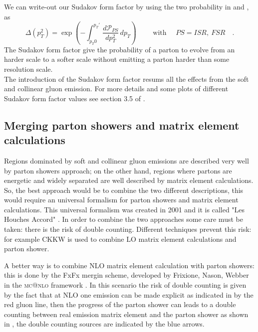 We can write-out our Sudakov form factor by using the two probability in  and , as
\begin{equation}
	\Delta(p_T^2)=\exp\left( -\displaystyle\int_{p_T0}^{p_T'} \frac{d\mathcal{P}_{PS}}{dp_T^2} \,dp_T\right) \qquad\text{ with } \quad PS=ISR,\ FSR \quad.
	\label{eq:sudakovFormFactor}
\end{equation}
The Sudakov form factor give the probability of a parton to evolve from an harder scale to a softer scale without emitting a parton harder than some resolution scale. 
\\
The introduction of the Sudakov form factor resums all the effects from the soft and collinear gluon emission. For more details and some plots of different Sudakov form factor values see section 3.5 of \cite{Campbell2006}.

\subsection{Merging parton showers and matrix element calculations}

Regions dominated by soft and collinear gluon emissions are described very well by parton showers approach; on the other hand, regions where partons are  energetic and widely separated are well described by matrix element calculations.  
So, the best approach would be to combine the two different descriptions, this would require an universal formalism for parton showers and matrix element calculations. This universal formalism was created in 2001 and it is called "Les Houches Accord" \cite{LesHouchesAccord}.
In order to combine the two approaches some care must be taken: there is the risk of double counting. Different techniques prevent this risk: for example CKKW \cite{CKKW2001} is used to combine LO matrix element calculations and parton shower.


A better way is to combine NLO matrix element calculation with parton showers: this is done by the FxFx mergin scheme, developed by Frixione, Nason, Webber in the \textsc{mc@nlo} framework \cite{FxFx1,FxFx2,FxFx3,FxFx4}. In this scenario the risk of  double counting is given by the fact that at NLO one emission can be made explicit as indicated in  by the red gluon line, then the progress of the parton shower can leads to a double counting between real emission matrix element and the parton shower as shown in , the double counting sources are indicated by the blue arrows.


